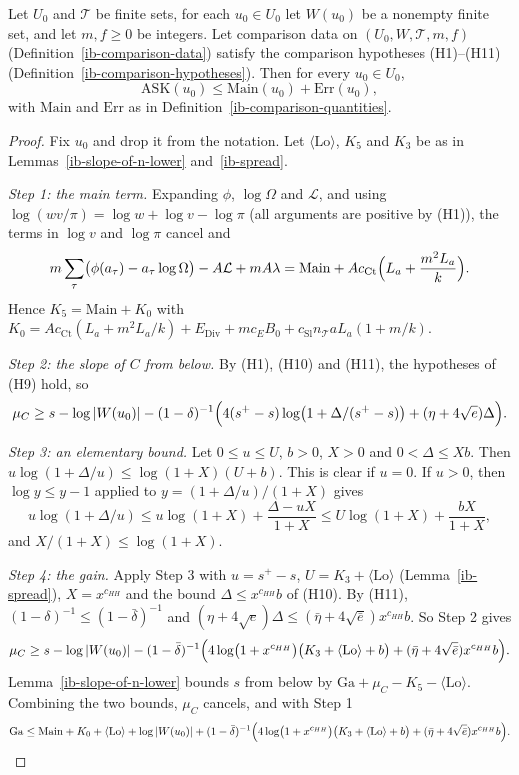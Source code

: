 \begin{theorem}\label{ib-comparison-inequality}
Let $U_0$ and $\mathcal T$ be finite sets, for each $u_0\in U_0$ let $W(u_0)$ be
a nonempty finite set, and let $m,f\geq0$ be integers. Let comparison data on
$(U_0,W,\mathcal T,m,f)$ (Definition~\ref{ib-comparison-data}) satisfy the
comparison hypotheses (H1)--(H11) (Definition~\ref{ib-comparison-hypotheses}).
Then for every $u_0\in U_0$,
\[
 \mathrm{ASK}(u_0)\leq\mathrm{Main}(u_0)+\mathrm{Err}(u_0),
\]
with $\mathrm{Main}$ and $\mathrm{Err}$ as in
Definition~\ref{ib-comparison-quantities}.
\end{theorem}
\begin{proof}
Fix $u_0$ and drop it from the notation. Let $\langle\mathrm{Lo}\rangle$, $K_5$
and $K_3$ be as in Lemmas~\ref{ib-slope-of-n-lower} and~\ref{ib-spread}.

\emph{Step 1: the main term.} Expanding $\phi$, $\log\Omega$ and $\mathcal L$,
and using $\log(w v/\pi)=\log w+\log v-\log\pi$ (all arguments are positive by
(H1)), the terms in $\log v$ and $\log\pi$ cancel and
\[
 m\sum_\tau\bigl(\phi(a_\tau)-a_\tau\log\Omega\bigr)-A\mathcal L+mA\lambda
 =\mathrm{Main}+Ac_{\mathrm{Ct}}\Bigl(L_a+\frac{m^2L_a}k\Bigr).
\]
Hence $K_5=\mathrm{Main}+K_0$ with
$K_0=Ac_{\mathrm{Ct}}(L_a+m^2L_a/k)+E_{\mathrm{Div}}+mc_EB_0
+c_{\mathrm{Sl}}n_{\mathcal T}aL_a(1+m/k)$.

\emph{Step 2: the slope of $C$ from below.} By (H1), (H10) and (H11), the
hypotheses of (H9) hold, so
\[
 \mu_C\geq s-\log|W(u_0)|-(1-\delta)^{-1}\Bigl(4(s^+-s)\log\bigl(1+\Delta/(s^+-s)\bigr)
 +(\eta+4\sqrt e)\Delta\Bigr).
\]

\emph{Step 3: an elementary bound.} Let $0\leq u\leq U$, $b>0$, $X>0$ and
$0<\Delta\leq Xb$. Then $u\log(1+\Delta/u)\leq\log(1+X)(U+b)$. This is clear if
$u=0$. If $u>0$, then $\log y\leq y-1$ applied to $y=(1+\Delta/u)/(1+X)$ gives
\[
 u\log(1+\Delta/u)\leq u\log(1+X)+\frac{\Delta-uX}{1+X}
 \leq U\log(1+X)+\frac{bX}{1+X},
\]
and $X/(1+X)\leq\log(1+X)$.

\emph{Step 4: the gain.} Apply Step 3 with $u=s^+-s$, $U=K_3+\langle\mathrm{Lo}\rangle$
(Lemma~\ref{ib-spread}), $X=x^{c_{HH}}$ and the bound $\Delta\leq x^{c_{HH}}b$ of
(H10). By (H11), $(1-\delta)^{-1}\leq(1-\bar\delta)^{-1}$ and
$(\eta+4\sqrt e)\Delta\leq(\bar\eta+4\sqrt{\bar e})x^{c_{HH}}b$. So Step 2 gives
\[
 \mu_C\geq s-\log|W(u_0)|-(1-\bar\delta)^{-1}\Bigl(4\log\bigl(1+x^{c_{HH}}\bigr)
 \bigl(K_3+\langle\mathrm{Lo}\rangle+b\bigr)+(\bar\eta+4\sqrt{\bar e})x^{c_{HH}}b\Bigr).
\]
Lemma~\ref{ib-slope-of-n-lower} bounds $s$ from below by
$\mathrm{Ga}+\mu_C-K_5-\langle\mathrm{Lo}\rangle$. Combining the two bounds,
$\mu_C$ cancels, and with Step 1
\[
 \mathrm{Ga}\leq\mathrm{Main}+K_0+\langle\mathrm{Lo}\rangle+\log|W(u_0)|
 +(1-\bar\delta)^{-1}\Bigl(4\log\bigl(1+x^{c_{HH}}\bigr)\bigl(K_3+\langle\mathrm{Lo}\rangle+b\bigr)
 +(\bar\eta+4\sqrt{\bar e})x^{c_{HH}}b\Bigr).
\]


\end{proof}

